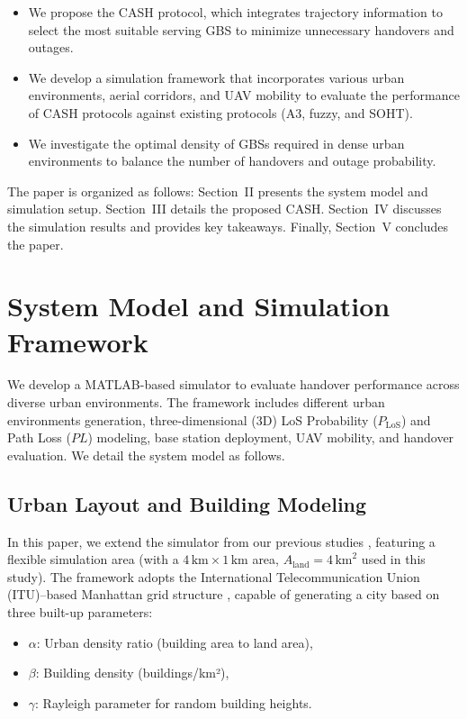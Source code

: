 \documentclass[10pt,conference]{IEEEtran}
\begin{document}
\begin{itemize}
    \item We propose the CASH protocol, which integrates trajectory information to select the most suitable serving GBS to minimize unnecessary handovers and outages.
    \item We develop a simulation framework that incorporates various urban environments, aerial corridors, and UAV mobility to evaluate the performance of CASH protocols against existing protocols (A3, fuzzy, and SOHT).
    \item We investigate the optimal density of GBSs required in dense urban environments to balance the number of handovers and outage probability.   
\end{itemize}

The paper is organized as follows: Section~II presents the system model and simulation setup. Section~III details the proposed CASH. Section~IV discusses the simulation results and provides key takeaways. Finally, Section~V concludes the paper.


\section{System Model and Simulation Framework}
We develop a MATLAB-based simulator to evaluate handover performance across diverse urban environments. The framework includes different urban environments generation, three-dimensional (3D) LoS Probability ($P_{\mathrm{LoS}}$) and  Path Loss ($PL$) modeling, base station deployment, UAV mobility, and handover evaluation. We detail the system model as follows. 

\subsection{Urban Layout and Building Modeling}
In this paper, we extend the simulator from our previous studies \cite{saboorEUCAP, saboorWCNC}, featuring a flexible simulation area (with a $4\,\mathrm{km} \times 1\,\mathrm{km}$ area, $A_{\text{land}} = 4\,\mathrm{km}^2$ used in this study). The framework adopts the International Telecommunication Union (ITU)--based Manhattan grid structure \cite{ITU}, capable of generating a city based on three built-up parameters:



\begin{itemize}
    \item $\alpha$: Urban density ratio (building area to land area),
    \item \(\beta\): Building density (buildings/km²),
    \item \(\gamma\): Rayleigh parameter for random building heights.
\end{itemize}
\end{document}

